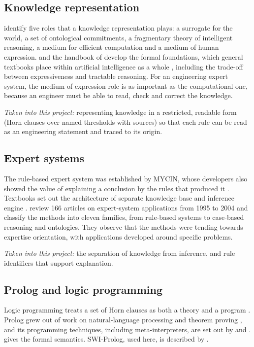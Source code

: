 \subsection{Knowledge representation}

\textcite{davis1993} identify five roles that a knowledge representation plays: a surrogate for the world, a set of ontological commitments, a fragmentary theory of intelligent reasoning, a medium for efficient computation and a medium of human expression. \textcite{brachman2004} and the handbook of \textcite{vanharmelen2008} develop the formal foundations, which general textbooks place within artificial intelligence as a whole \parencite{russell2021}, including the trade-off between expressiveness and tractable reasoning. For an engineering expert system, the medium-of-expression role is as important as the computational one, because an engineer must be able to read, check and correct the knowledge.

\emph{Taken into this project:} representing knowledge in a restricted, readable form (Horn clauses over named thresholds with sources) so that each rule can be read as an engineering statement and traced to its origin.

\subsection{Expert systems}

The rule-based expert system was established by MYCIN, whose developers also showed the value of explaining a conclusion by the rules that produced it \parencite{buchanan1984}. Textbooks set out the architecture of separate knowledge base and inference engine \parencite{jackson1998,giarratano2005}. \textcite{liao2005} review 166 articles on expert-system applications from 1995 to 2004 and classify the methods into eleven families, from rule-based systems to case-based reasoning and ontologies. They observe that the methods were tending towards expertise orientation, with applications developed around specific problems.

\emph{Taken into this project:} the separation of knowledge from inference, and rule identifiers that support explanation.

\subsection{Prolog and logic programming}

Logic programming treats a set of Horn clauses as both a theory and a program \parencite{kowalski1979}. Prolog grew out of work on natural-language processing and theorem proving \parencite{colmerauer1993}, and its programming techniques, including meta-interpreters, are set out by \textcite{sterling1994} and \textcite{bratko2012}. \textcite{lloyd1987} gives the formal semantics. SWI-Prolog, used here, is described by \textcite{wielemaker2012}.

